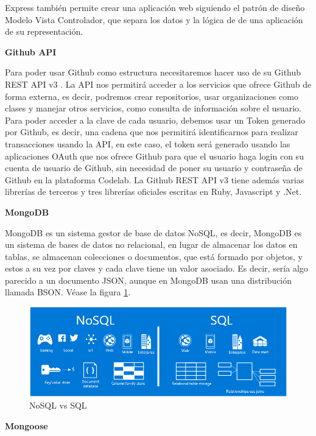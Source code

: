 Express también permite crear una aplicación web siguiendo el patrón de diseño Modelo Vista Controlador, que separa los datos y la lógica de de una aplicación de su representación.

{\bf Github API}

Para poder usar Github como estructura necesitaremos hacer uso de su Github REST API v3 \cite {B3}. 
La API nos permitirá acceder a los servicios que ofrece Github de forma externa, es decir, podremos crear repositorios, usar organizaciones como clases y manejar otros servicios, como consulta de información sobre el usuario.
Para poder acceder a la clave de cada usuario, debemos usar un Token generado por Github, es decir, una cadena que nos permitirá  identificarnos para realizar transacciones usando la API, en este caso, el token será generado 
usando las aplicaciones OAuth que nos ofrece Github para que el usuario haga login con su cuenta de usuario de Github, sin necesidad de poner su usuario y contraseña de Github en la plataforma Codelab.
La Github REST API v3 tiene además varias librerías de terceros y tres librerías oficiales escritas en Ruby, Javascript y .Net.

{\bf MongoDB}

MongoDB \cite{B9} es un sistema gestor de base de datos NoSQL, es decir,
MongoDB es un sistema de bases de datos no relacional, en lugar de
almacenar los datos en tablas, se almacenan colecciones o documentos,
que está formado por objetos, y estos a su vez por claves y cada
clave tiene un valor asociado. Es decir, sería algo parecido a un
documento JSON, aunque en MongoDB usan una distribución llamada
BSON.  Véase la figura \ref{fig:NoSQLvsSQL}.

\begin{figure}[!th]
\begin{center}
\includegraphics[scale=0.5]{images/nosql}
\caption{NoSQL vs SQL}
\label{fig:NoSQLvsSQL}
\end{center}
\end{figure}

{\bf Mongoose}


